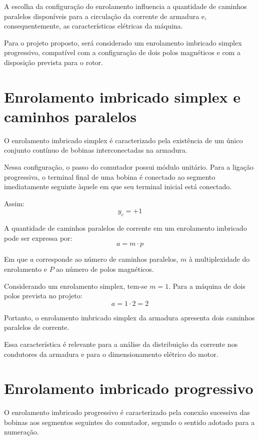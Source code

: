 \documentclass[12pt,openright,oneside,a4paper,brazilian]{abntex2}
\begin{document}
A escolha da configuração do enrolamento influencia a quantidade de caminhos paralelos disponíveis para a circulação da corrente de armadura e, consequentemente, as características elétricas da máquina.

Para o projeto proposto, será considerado um enrolamento imbricado simplex progressivo, compatível com a configuração de dois polos magnéticos e com a disposição prevista para o rotor.
\section{Enrolamento imbricado simplex e caminhos paralelos}
O enrolamento imbricado simplex é caracterizado pela existência de um único conjunto contínuo de bobinas interconectadas na armadura.

Nessa configuração, o passo do comutador possui módulo unitário. Para a ligação progressiva, o terminal final de uma bobina é conectado ao segmento imediatamente seguinte àquele em que seu terminal inicial está conectado.

Assim:
\begin{equation}
y_c = +1
\end{equation}

A quantidade de caminhos paralelos de corrente em um enrolamento imbricado pode ser expressa por:
\begin{equation}
a = m \cdot p
\end{equation}

Em que $a$ corresponde ao número de caminhos paralelos, $m$ à multiplexidade do enrolamento e $P$ ao número de polos magnéticos.

Considerando um enrolamento simplex, tem-se $m=1$. Para a máquina de dois polos prevista no projeto:
\begin{equation}
a = 1 \cdot 2 = 2
\end{equation}

Portanto, o enrolamento imbricado simplex da armadura apresenta dois caminhos paralelos de corrente.

Essa característica é relevante para a análise da distribuição da corrente nos condutores da armadura e para o dimensionamento elétrico do motor.
\section{Enrolamento imbricado progressivo}
O enrolamento imbricado progressivo é caracterizado pela conexão sucessiva das bobinas aos segmentos seguintes do comutador, segundo o sentido adotado para a numeração.
\end{document}
